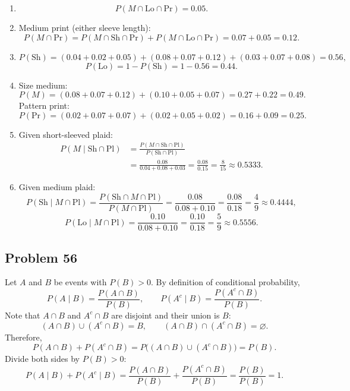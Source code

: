 \documentclass{article}
\begin{document}
\begin{enumerate}
\item[(a)]
\[
P(M\cap \text{Lo}\cap \text{Pr}) = 0.05.
\]

\item[(b)] Medium print (either sleeve length):
\[
P(M\cap \text{Pr}) = P(M\cap \text{Sh}\cap \text{Pr}) + P(M\cap \text{Lo}\cap \text{Pr})
=0.07+0.05=0.12.
\]

\item[(c)]
\[
P(\text{Sh}) = (0.04+0.02+0.05)+(0.08+0.07+0.12)+(0.03+0.07+0.08)=0.56,
\]
\[
P(\text{Lo}) = 1-P(\text{Sh}) = 1-0.56=0.44.
\]

\item[(d)] Size medium:
\[
P(M)=(0.08+0.07+0.12)+(0.10+0.05+0.07)=0.27+0.22=0.49.
\]
Pattern print:
\[
P(\text{Pr})=(0.02+0.07+0.07)+(0.02+0.05+0.02)=0.16+0.09=0.25.
\]

\item[(e)] Given short-sleeved plaid:
\[
\begin{aligned}
P(M\mid \text{Sh}\cap \text{Pl})
&=\frac{P(M\cap \text{Sh}\cap \text{Pl})}{P(\text{Sh}\cap \text{Pl})}\\
&=\frac{0.08}{0.04+0.08+0.03}
=\frac{0.08}{0.15}
=\frac{8}{15}\approx 0.5333.
\end{aligned}
\]

\item[(f)] Given medium plaid:
\[
P(\text{Sh}\mid M\cap \text{Pl})=\frac{P(\text{Sh}\cap M\cap \text{Pl})}{P(M\cap \text{Pl})}
=\frac{0.08}{0.08+0.10}
=\frac{0.08}{0.18}
=\frac{4}{9}\approx 0.4444,
\]
\[
P(\text{Lo}\mid M\cap \text{Pl})=\frac{0.10}{0.08+0.10}
=\frac{0.10}{0.18}
=\frac{5}{9}\approx 0.5556.
\]
\end{enumerate}

\subsection*{Problem 56}

Let $A$ and $B$ be events with $P(B)>0$. By definition of conditional probability,
\[
P(A\mid B)=\frac{P(A\cap B)}{P(B)},\qquad
P(A^c\mid B)=\frac{P(A^c\cap B)}{P(B)}.
\]
Note that $A\cap B$ and $A^c\cap B$ are disjoint and their union is $B$:
\[
(A\cap B)\cup(A^c\cap B)=B,\qquad (A\cap B)\cap(A^c\cap B)=\varnothing.
\]
Therefore,
\[
P(A\cap B)+P(A^c\cap B)=P\big((A\cap B)\cup(A^c\cap B)\big)=P(B).
\]
Divide both sides by $P(B)>0$:
\[
P(A\mid B)+P(A^c\mid B)=\frac{P(A\cap B)}{P(B)}+\frac{P(A^c\cap B)}{P(B)}
=\frac{P(B)}{P(B)}=1.
\]
\end{document}
